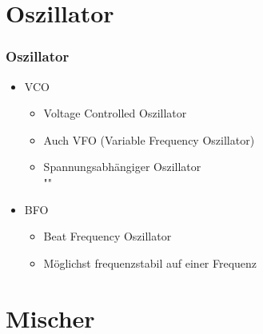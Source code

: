 \section*{Oszillator}

\begin{frame}
  \frametitle{Oszillator}
  \begin{center}
    \begin{itemize}
      \item VCO
        \begin{itemize}
          \item Voltage Controlled Oszillator
          \item Auch VFO (Variable Frequency Oszillator)
          \item Spannungsabhängiger Oszillator \\ ""
        \end{itemize}
      \item BFO
        \begin{itemize}
          \item Beat Frequency Oszillator
          \item Möglichst frequenzstabil auf einer Frequenz
        \end{itemize}
    \end{itemize}
  \end{center}
\end{frame}

%

\section*{Mischer}

